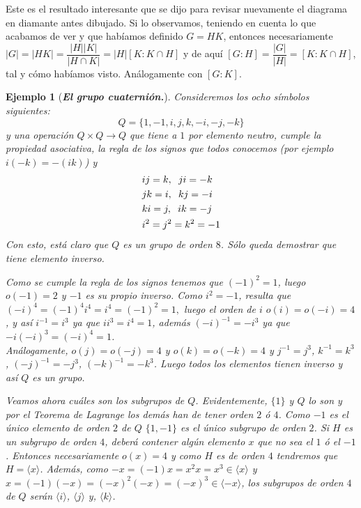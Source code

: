\documentclass[12pt]{article}
\newtheorem{example}{Ejemplo}[theorem]
\begin{document}
Este es el resultado interesante que se dijo para revisar nuevamente el diagrama en diamante antes dibujado. Si lo observamos, teniendo en cuenta lo que acabamos de ver y que habíamos definido $G= HK$, entonces necesariamente $|G| =|HK| = \dfrac{|H| |K|}{|H \cap K |} = |H| [K : K \cap H]$ y de aquí $[G:H] = \dfrac{|G|}{|H|} = [K : K \cap H]$, tal y cómo habíamos visto. Análogamente con $[G:K]$.

\begin{example}[\textbf{\textit{El grupo cuaternión.}}]
Consideremos los ocho símbolos siguientes: $$ Q = \lbrace 1,-1, i, j, k, -i,-j,-k \rbrace$$ y una operación $Q \times Q \longrightarrow Q$ que tiene a $1$ por elemento neutro, cumple la propiedad asociativa, la regla de los signos que todos conocemos (por ejemplo $i(-k) = -(ik)$) y \begin{equation*}
\begin{aligned}
&ij = k, \hspace{0.2cm} ji = -k\\
&jk = i, \hspace{0.2cm} kj = -i\\
&ki = j, \hspace{0.2cm} ik = -j\\
&i^{2} = j^{2} = k^{2} = -1
\end{aligned}
\end{equation*}
Con esto, está claro que $Q$ es un grupo de orden $8$. Sólo queda demostrar que tiene elemento inverso. 


Como se cumple la regla de los signos tenemos que $(-1)^{2} = 1$, luego $o(-1) =2$ y $-1$ es su propio inverso. Como $i^{2} = -1$, resulta que $(-i)^{4} = (-1)^{4}i^{4} = i^{4} = (-1)^{2} = 1,$ luego el orden de $i$ $o(i) = o(-i) = 4$, y así $i^{-1} = i^{3}$ ya que $ii^{3} = i^{4} = 1$, además $(-i)^{-1} = -i^{3}$ ya que $-i(-i)^{3} = (-i)^{4} = 1$. \vspace{0.2cm}\\
Análogamente, $o(j) = o(-j) = 4$ y $o(k) = o(-k) = 4$ y $j^{-1} = j^{3}$, $k^{-1} = k^{3}$, $(-j)^{-1} = -j^{3}$, $(-k)^{-1} = -k^{3}$. Luego todos los elementos tienen inverso y así $Q$ es un grupo.


Veamos ahora cuáles son los subgrupos de $Q$. Evidentemente, $\lbrace 1 \rbrace$ y $Q$ lo son y por el \textit{Teorema de Lagrange} los demás han de tener orden $2$ ó $4$. Como $-1$ es el único elemento de orden $2$ de $Q$ $\lbrace 1, -1 \rbrace$ es el único subgrupo de orden $2$. Si $H$ es un subgrupo de orden $4$, deberá contener algún elemento $x$ que no sea el $1$ ó el $-1$. Entonces necesariamente $o(x) = 4$ y como $H$ es de orden $4$ tendremos que $H = \langle x \rangle$. Además, como $-x = (-1)x = x^{2}x = x^{3} \in \langle x \rangle$ y $x  = (-1)(-x) = (-x)^{2}(-x) = (-x)^{3} \in \langle -x \rangle$, los subgrupos de orden $4$ de $Q$ serán $\langle i \rangle$, $\langle j \rangle$ y, $\langle k \rangle$.



\end{example}
\end{document}
